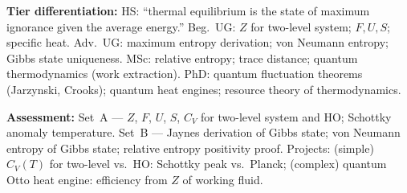 \documentclass[11pt,a4paper]{article}
\begin{document}
\begin{tcolorbox}[modulebox, title={Module~II.7 / L01: Density Operators in Thermodynamics}]
\medskip\textbf{Tier differentiation:}
HS: ``thermal equilibrium is the state of maximum ignorance given the average energy.''
Beg.\ UG: $Z$ for two-level system; $F,U,S$; specific heat.
Adv.\ UG: maximum entropy derivation; von Neumann entropy; Gibbs state uniqueness.
MSc: relative entropy; trace distance; quantum thermodynamics (work extraction).
PhD: quantum fluctuation theorems (Jarzynski, Crooks); quantum heat engines; resource theory of thermodynamics.

\medskip\textbf{Assessment:}
Set~A --- $Z$, $F$, $U$, $S$, $C_V$ for two-level system and HO; Schottky anomaly temperature.
Set~B --- Jaynes derivation of Gibbs state; von Neumann entropy of Gibbs state; relative entropy positivity proof.
Projects: (simple) $C_V(T)$ for two-level vs.\ HO: Schottky peak vs.\ Planck;
(complex) quantum Otto heat engine: efficiency from $Z$ of working fluid.
\end{tcolorbox}

\medskip
\end{document}
